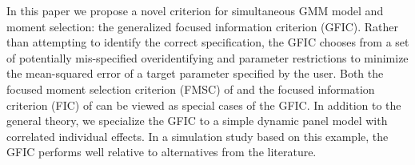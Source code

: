 In this paper we propose a novel criterion for simultaneous GMM model and moment selection: the generalized focused information criterion (GFIC). 
Rather than attempting to identify the correct specification, the GFIC chooses from a set of potentially mis-specified overidentifying and parameter restrictions to minimize the mean-squared error of a target parameter specified by the user. 
Both the focused moment selection criterion (FMSC) of \cite{DiTraglia2012} and the focused information criterion (FIC) of \cite{ClaeskensHjort2003} can be viewed as special cases of the GFIC. 
In addition to the general theory, we specialize the GFIC to a simple dynamic panel model with correlated individual effects. 
In a simulation study based on this example, the GFIC performs well relative to alternatives from the literature.

